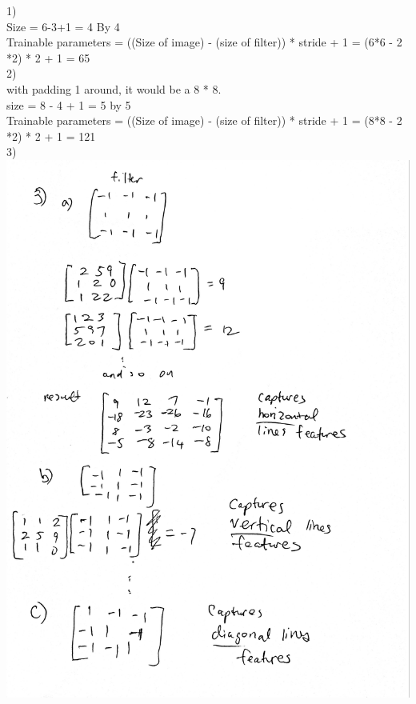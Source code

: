 \documentclass[11pt]{article}
\begin{document}
1) \\ 
Size = 6-3+1 = 4 By 4 \\
Trainable parameters = ((Size of image) - (size of filter)) * stride + 1
= (6*6 - 2 *2) * 2 + 1 = 65 \\ 

2) \\
with padding 1 around, it would be a 8 * 8. \\
size = 8 - 4 + 1 = 5 by 5 \\
Trainable parameters = ((Size of image) - (size of filter)) * stride + 1
= (8*8 - 2 *2) * 2 + 1 = 121 \\

3) \\
\includegraphics[scale=0.12]{p3} \\ \\ \\ \\ \\ \\ \\ \\ \\ \\
\end{document}
